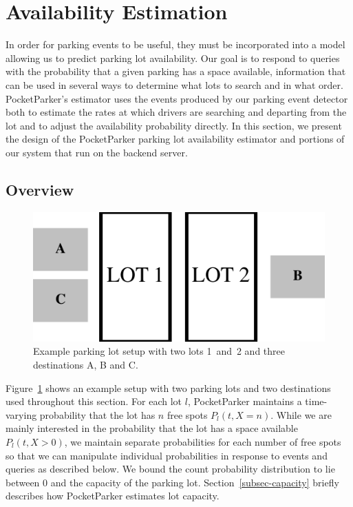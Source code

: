\clearpage
\newpage

\section{Availability Estimation}
\label{sec-model}

In order for parking events to be useful, they must be incorporated into a
model allowing us to predict parking lot availability. Our goal is to respond
to queries with the probability that a given parking has a space available,
information that can be used in several ways to determine what lots to search
and in what order. PocketParker's estimator uses the events produced by our
parking event detector both to estimate the rates at which drivers are
searching and departing from the lot and to adjust the availability
probability directly. In this section, we present the design of the
PocketParker parking lot availability estimator and portions of our system
that run on the backend server.

\subsection{Overview}

\begin{figure}
\centering
\includegraphics[width=\columnwidth]{./figures/CartoonLot.pdf}

\caption{Example parking lot setup with two lots 1~and~2 and three
destinations A, B and C.}

\label{fig-lots}
\end{figure}

Figure~\ref{fig-lots} shows an example setup with two parking lots and two
destinations used throughout this section. For each lot $l$, PocketParker
maintains a time-varying probability that the lot has $n$ free spots $P_l(t,
X = n)$. While we are mainly interested in the probability that the lot has a
space available $P_l(t, X > 0)$, we maintain separate probabilities for each
number of free spots so that we can manipulate individual probabilities in
response to events and queries as described below. We bound the count
probability distribution to lie between 0 and the capacity of the parking
lot. Section~\ref{subsec-capacity} briefly describes how PocketParker
estimates lot capacity.

